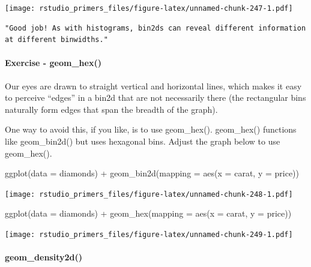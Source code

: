 \documentclass[
]{article}
\newenvironment{Shaded}{\begin{snugshade}}{\end{snugshade}}
\newcommand{\AttributeTok}[1]{\textcolor[rgb]{0.77,0.63,0.00}{#1}}
\newcommand{\FunctionTok}[1]{\textcolor[rgb]{0.00,0.00,0.00}{#1}}
\newcommand{\NormalTok}[1]{#1}
\newcommand{\SpecialCharTok}[1]{\textcolor[rgb]{0.00,0.00,0.00}{#1}}
\begin{document}
\texttt{[image: rstudio\_primers\_files/figure-latex/unnamed-chunk-247-1.pdf]}

\begin{verbatim}
"Good job! As with histograms, bin2ds can reveal different information at different binwidths."
\end{verbatim}

\hypertarget{exercise---geom_hex}{%
\paragraph{Exercise - geom\_hex()}\label{exercise---geom_hex}}

Our eyes are drawn to straight vertical and horizontal lines, which
makes it easy to perceive ``edges'' in a bin2d that are not necessarily
there (the rectangular bins naturally form edges that span the breadth
of the graph).

One way to avoid this, if you like, is to use geom\_hex(). geom\_hex()
functions like geom\_bin2d() but uses hexagonal bins. Adjust the graph
below to use geom\_hex().

\begin{Shaded}
\begin{Highlighting}[]
\FunctionTok{ggplot}\NormalTok{(}\AttributeTok{data =}\NormalTok{ diamonds) }\SpecialCharTok{+}
  \FunctionTok{geom\_bin2d}\NormalTok{(}\AttributeTok{mapping =} \FunctionTok{aes}\NormalTok{(}\AttributeTok{x =}\NormalTok{ carat, }\AttributeTok{y =}\NormalTok{ price))}
\end{Highlighting}
\end{Shaded}

\texttt{[image: rstudio\_primers\_files/figure-latex/unnamed-chunk-248-1.pdf]}

\begin{Shaded}
\begin{Highlighting}[]
\FunctionTok{ggplot}\NormalTok{(}\AttributeTok{data =}\NormalTok{ diamonds) }\SpecialCharTok{+}
  \FunctionTok{geom\_hex}\NormalTok{(}\AttributeTok{mapping =} \FunctionTok{aes}\NormalTok{(}\AttributeTok{x =}\NormalTok{ carat, }\AttributeTok{y =}\NormalTok{ price))}
\end{Highlighting}
\end{Shaded}

\texttt{[image: rstudio\_primers\_files/figure-latex/unnamed-chunk-249-1.pdf]}

\hypertarget{geom_density2d}{%
\paragraph{geom\_density2d()}\label{geom_density2d}}
\end{document}
